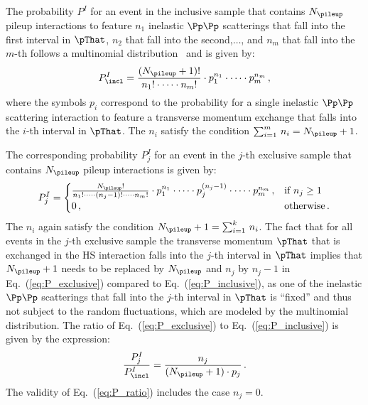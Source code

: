 The probability $P^{I}$ for an event in the inclusive sample that contains $N_{\pileup}$ pileup interactions
to feature $n_{1}$ inelastic $\Pp\Pp$ scatterings that fall into the first interval in $\pThat$, $n_{2}$ that fall into the second,$\dots$, and $n_{m}$ that fall into the $m$-th 
follows a multinomial distribution~\cite{evans2011statistical} and is given by:
\begin{equation}
P_{\incl}^{I} = \frac{(N_{\pileup} + 1)!}{n_{1}! \cdot \dots \cdot n_{m}!} \cdot p_{1}^{n_{1}} \cdot \dots \cdot p_{m}^{n_{m}} \, ,
\label{eq:P_inclusive}
\end{equation}
where the symbols $p_{i}$ correspond to the probability for a single inelastic $\Pp\Pp$ scattering interaction to feature a transverse momentum exchange that falls into the $i$-th interval in $\pThat$.
The $n_{i}$ satisfy the condition $\sum_{i=1}^{m} \, n_{i} = N_{\pileup} + 1$.

The corresponding probability $P_{j}^{I}$ for an event in the $j$-th exclusive sample that contains $N_{\pileup}$ pileup interactions is given by:
\begin{equation}
P_{j}^{I} = \begin{cases}
\frac{N_{\pileup}!}{n_{1}! \cdot \dots \cdot (n_{j} - 1)! \cdot \dots \cdot n_{m}!} \cdot p_{1}^{n_{1}} \cdot \dots \cdot p_{j}^{(n_{j} - 1)} \cdot \dots \cdot p_{m}^{n_{m}} \, ,
  & \text{if $n_{j} \geq 1$} \\
0 \, , & \text{otherwise} \, .
\end{cases}
\label{eq:P_exclusive}
\end{equation}
The $n_{i}$ again satisfy the condition $N_{\pileup} + 1 = \sum_{i=1}^{k} \, n_{i}$.
The fact that for all events in the $j$-th exclusive sample the transverse momentum $\pThat$ that is exchanged in the HS interaction falls into the $j$-th interval in $\pThat$
implies that $N_{\pileup} + 1$ needs to be replaced by $N_{\pileup}$ and $n_{j}$ by $n_{j} - 1$ in Eq.~(\ref{eq:P_exclusive}) compared to Eq.~(\ref{eq:P_inclusive}),
as one of the inelastic $\Pp\Pp$ scatterings that fall into the $j$-th interval in $\pThat$ is ``fixed'' and thus not subject to the random fluctuations, which are modeled by the multinomial distribution.
The ratio of Eq.~(\ref{eq:P_exclusive}) to Eq.~(\ref{eq:P_inclusive}) is given by the expression:
\begin{equation}
\frac{P_{j}^{I}}{P_{\incl}^{I}} = \frac{n_{j}}{(N_{\pileup} + 1) \cdot p_{j}} \, .
\label{eq:P_ratio}
\end{equation}
The validity of Eq.~(\ref{eq:P_ratio}) includes the case $n_{j} = 0$.

